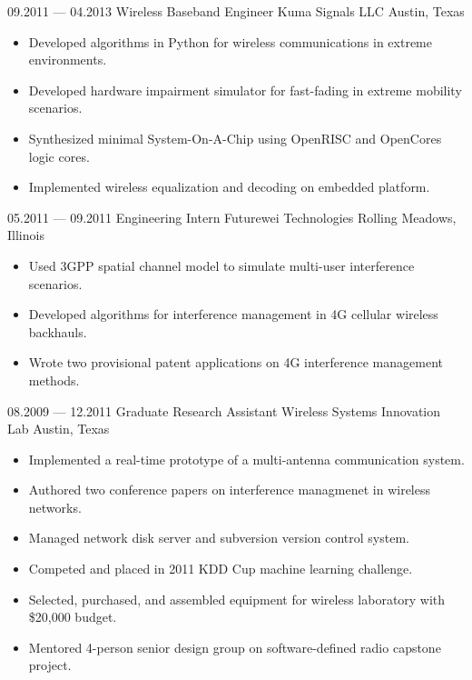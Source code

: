 \documentclass[11pt,a4paper,sans]{moderncv}
\begin{document}
\cventry%
    {09.2011 --- 04.2013}%
    {Wireless Baseband Engineer}%
    {Kuma Signals LLC}%
    {Austin, Texas}%
    {}%
    {%
    \begin{itemize}
        \item Developed algorithms in Python for wireless communications in extreme environments.
        \item Developed hardware impairment simulator for fast-fading in extreme mobility scenarios.
        \item Synthesized minimal System-On-A-Chip using OpenRISC and OpenCores logic cores.
        \item Implemented wireless equalization and decoding on embedded platform.
    \end{itemize}%
    }

\cventry%
    {05.2011 --- 09.2011}%
    {Engineering Intern}%
    {Futurewei Technologies}%
    {Rolling Meadows, Illinois}%
    {}%
    {%
    \begin{itemize}
        \item Used 3GPP spatial channel model to simulate multi-user interference scenarios.
        \item Developed algorithms for interference management in 4G cellular wireless backhauls.
        \item Wrote two provisional patent applications on 4G interference management methods.
    \end{itemize}%
    }

\cventry%
    {08.2009 --- 12.2011}%
    {Graduate Research Assistant}%
    {Wireless Systems Innovation Lab}%
    {Austin, Texas}%
    {}%
    {%
    \begin{itemize}
        \item Implemented a real-time prototype of a multi-antenna communication system.
        \item Authored two conference papers on interference managmenet in wireless networks.
        \item Managed network disk server and subversion version control system.
        \item Competed and placed in 2011 KDD Cup machine learning challenge.
        \item Selected, purchased, and assembled equipment for wireless laboratory with \$20,000 budget.
        \item Mentored 4-person senior design group on software-defined radio capstone project.
    \end{itemize}%
    }
\end{document}
